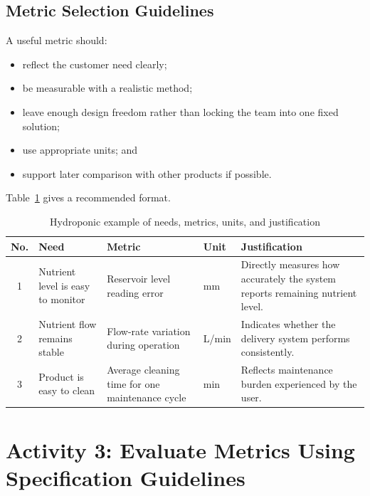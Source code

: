 \subsection{Metric Selection Guidelines}

A useful metric should:
\begin{itemize}
    \item reflect the customer need clearly;
    \item be measurable with a realistic method;
    \item leave enough design freedom rather than locking the team into one fixed solution;
    \item use appropriate units; and
    \item support later comparison with other products if possible.
\end{itemize}

Table~\ref{tab:session8-metric-definition} gives a recommended format.

\begin{table}[htbp]
\centering
\caption{Hydroponic example of needs, metrics, units, and justification}
\label{tab:session8-metric-definition}
\renewcommand{\arraystretch}{1.2}
\begin{tabularx}{\textwidth}{|c|>{\raggedright\arraybackslash}X|>{\raggedright\arraybackslash}p{}|>{\raggedright\arraybackslash}p{}|>{\raggedright\arraybackslash}X|}
\hline
\textbf{No.} & \textbf{Need} & \textbf{Metric} & \textbf{Unit} & \textbf{Justification} \\
\hline
1 & Nutrient level is easy to monitor & Reservoir level reading error & mm & Directly measures how accurately the system reports remaining nutrient level. \\
\hline
2 & Nutrient flow remains stable & Flow-rate variation during operation & L/min & Indicates whether the delivery system performs consistently. \\
\hline
3 & Product is easy to clean & Average cleaning time for one maintenance cycle & min & Reflects maintenance burden experienced by the user. \\
\hline
\end{tabularx}
\end{table}

\section{Activity 3: Evaluate Metrics Using Specification Guidelines}


